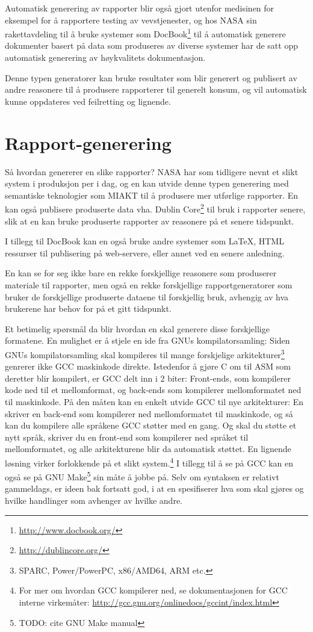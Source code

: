 \documentclass[11pt]{article}
\begin{document}
Automatisk generering av rapporter blir også gjort utenfor medisinen for eksempel for å rapportere testing av vevstjenester\cite{ webrepgen}, og hos NASA\cite{modbasedrepgen} sin rakettavdeling til å bruke systemer som DocBook\footnote{\url{http://www.docbook.org/}} til å automatisk generere dokumenter basert på data som produseres av diverse systemer har de satt opp automatisk generering av høykvalitets dokumentasjon.

Denne typen generatorer kan bruke resultater som blir generert og publisert av andre reasonere til å produsere rapporterer til generelt konsum, og vil automatisk kunne oppdateres ved feilretting og lignende.

\section{Rapport-generering}
Så hvordan genererer en slike rapporter?
NASA har som tidligere nevnt et slikt system i produksjon per i dag\cite{modbasedrepgen}, og en kan utvide denne typen generering med semantiske teknologier som MIAKT\cite{repgenmiakt} til å produsere mer utførlige rapporter.
En kan også publisere produserte data vha. Dublin Core\footnote{\url{http://dublincore.org/}} til bruk i rapporter senere, slik at en kan bruke produserte rapporter av reasonere på et senere tidspunkt.

I tillegg til DocBook kan en også bruke andre systemer som \LaTeX, HTML ressurser til publisering på web-servere, eller annet ved en senere anledning.

En kan se for seg ikke bare en rekke forskjellige reasonere som produserer materiale til rapporter, men også en rekke forskjellige rapportgeneratorer som bruker de forskjellige produserte dataene til forskjellig bruk, avhengig av hva brukerene har behov for på et gitt tidspunkt.

Et betimelig spørsmål da blir hvordan en skal generere disse forskjellige formatene.
En mulighet er å stjele en ide fra GNUs kompilatorsamling: Siden GNUs kompilatorsamling skal kompileres til mange forskjelige arkitekturer\footnote{SPARC, Power/PowerPC, x86/AMD64, ARM etc.} genrerer ikke GCC maskinkode direkte. Istedenfor å gjøre C om til ASM som deretter blir kompilert, er GCC delt inn i 2 biter:
Front-ends, som kompilerer kode ned til et mellomformat, og back-ends som kompilerer mellomformatet ned til maskinkode.
På den måten kan en enkelt utvide GCC til nye arkitekturer: En skriver en back-end som kompilerer ned mellomformatet til maskinkode, og så kan du kompilere alle språkene GCC støtter med en gang.
Og skal du støtte et nytt språk, skriver du en front-end som kompilerer ned språket til mellomformatet, og alle arkitekturene blir da automatisk støttet.
En lignende løsning virker forlokkende på et slikt system.\footnote{For mer om hvordan GCC kompilerer ned, se dokumentasjonen for GCC interne virkemåter: \url{http://gcc.gnu.org/onlinedocs/gccint/index.html}}
I tillegg til å se på GCC kan en også se på GNU Make\footnote{TODO: cite GNU Make manual} sin måte å jobbe på. Selv om syntaksen er relativt gammeldags, er ideen bak fortsatt god, i at en spesifiserer hva som skal gjøres og hvilke handlinger som avhenger av hvilke andre.
\end{document}
